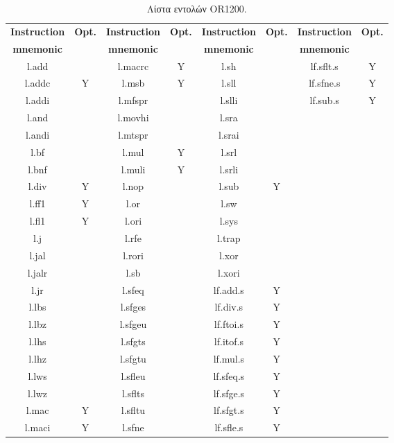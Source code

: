 \documentclass[a4paper,10pt]{article}
\numberwithin{figure}{section}
\numberwithin{table}{section}
\begin{document}
\vspace{0.7cm}
\renewcommand{\arraystretch}{1.2}
\setlength{\tabcolsep}{0.2em}
\begin{table}[h!]
\begin{center}
\begin{tabular}{|c|c|c|c|c|c|c|c|}
\hline
\rowcolor{tcA}
\bf{Instruction} & \bf{Opt.} & \bf{Instruction} & \bf{Opt.} & \bf{Instruction} & \bf{Opt.} & \bf{Instruction} & \bf{Opt.}\\
\rowcolor{tcA}
\bf{mnemonic} &   & \bf{mnemonic}&   & \bf{mnemonic} &   & \bf{mnemonic} &  \\\hline
l.add &  & l.macrc & Y & l.sh &  & lf.sflt.s & Y\\\hline
l.addc & Y & l.msb & Y & l.sll &  & lf.sfne.s & Y\\\hline
l.addi &  & l.mfspr &  & l.slli &  & lf.sub.s & Y\\\hline
l.and &  & l.movhi &  & l.sra &  &  & \\\hline
l.andi &  & l.mtspr &  & l.srai &  &  & \\\hline
l.bf &  & l.mul & Y & l.srl &  &  & \\\hline
l.bnf &  & l.muli & Y & l.srli &  &  & \\\hline
l.div & Y & l.nop &  & l.sub & Y &  & \\\hline
l.ff1 & Y & l.or &  & l.sw&  &  & \\\hline
l.fl1 & Y & l.ori &  & l.sys &  &  & \\\hline
l.j &  & l.rfe &  & l.trap &  &  & \\\hline
l.jal &  & l.rori &  & l.xor &  &  & \\\hline
l.jalr &  & l.sb &  & l.xori &  &  & \\\hline
l.jr &  & l.sfeq &  & lf.add.s & Y &  & \\\hline
l.lbs &  & l.sfges &  & lf.div.s & Y &  & \\\hline
l.lbz &  & l.sfgeu &  & lf.ftoi.s & Y &  & \\\hline
l.lhs &  & l.sfgts &  & lf.itof.s & Y &  & \\\hline
l.lhz &  & l.sfgtu &  & lf.mul.s & Y &  & \\\hline
l.lws &  & l.sfleu &  & lf.sfeq.s & Y &  & \\\hline
l.lwz &  & l.sflts &  & lf.sfge.s & Y &  & \\\hline
l.mac & Y & l.sfltu &  & lf.sfgt.s & Y &  & \\\hline
l.maci & Y & l.sfne &  & lf.sfle.s & Y &  & \\\hline
\end{tabular}
\end{center}
\caption{Λίστα εντολών OR1200.}
\end{table}
\newpage
\end{document}
